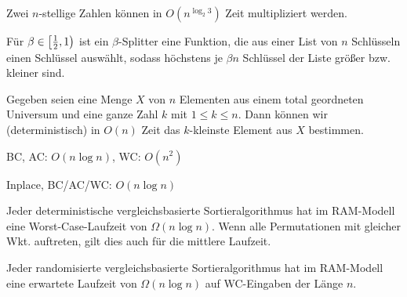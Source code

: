 \documentclass{cheat-sheet}
\begin{document}

\begin{satz}
  Zwei $n$-stellige Zahlen können in $O(n^{\log_2 3})$ Zeit multipliziert werden.
\end{satz}


\begin{defn}
  Für $\beta \in \left[ \tfrac{1}{2}, 1 \right)$ ist ein $\beta$-Splitter eine Funktion, die aus einer List von $n$ Schlüsseln einen Schlüssel auswählt, sodass höchstens je $\beta n$ Schlüssel der Liste größer bzw. kleiner sind.
\end{defn}

\begin{satz}[Selektion]
  Gegeben seien eine Menge $X$ von $n$ Elementen aus einem total geordneten Universum und eine ganze Zahl $k$ mit $1 \leq k \leq n$. Dann können wir (deterministisch) in $O(n)$ Zeit das $k$-kleinste Element aus $X$ bestimmen.
\end{satz}


\begin{alg}[Quicksort]
  BC, AC: $O(n \log n)$, WC: $O(n^2)$
\end{alg}


\begin{alg}[Heapsort]
  Inplace, BC/AC/WC: $O(n \log n)$
\end{alg}


\begin{satz}
  Jeder deterministische vergleichsbasierte Sortieralgorithmus hat im RAM-Modell eine Worst-Case-Laufzeit von $\Omega(n \log n)$. Wenn alle Permutationen mit gleicher Wkt. auftreten, gilt dies auch für die mittlere Laufzeit.
\end{satz}

\begin{satz}
  Jeder randomisierte vergleichsbasierte Sortieralgorithmus hat im RAM-Modell eine erwartete Laufzeit von $\Omega(n \log n)$ auf WC-Eingaben der Länge $n$.
\end{satz}

\end{document}
